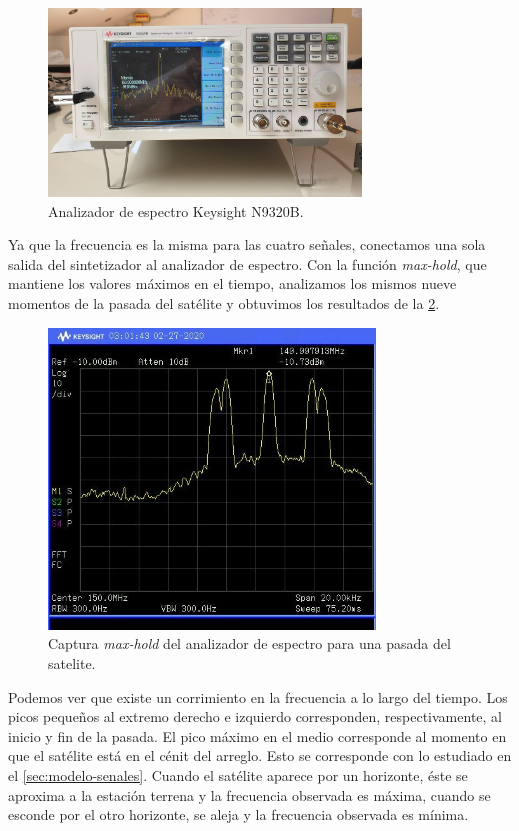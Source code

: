 \documentclass{article}
\newenvironment{standalone}{\begin{preview}}{\end{preview}}
\begin{document}
\begin{standalone}
  \begin{figure}[!htbp]
    \centering
    \includegraphics[width=\linewidth, height=50mm, keepaspectratio]{../images/analizador-espectro.jpg}
    \caption{Analizador de espectro Keysight N9320B.}
    \label{fig:analizador-espectro}
  \end{figure}

  Ya que la frecuencia es la misma para las cuatro señales, conectamos una sola salida del sintetizador al analizador de espectro.
  Con la función \textit{max-hold}, que mantiene los valores máximos en el tiempo, analizamos los mismos nueve momentos de la pasada del satélite y obtuvimos los resultados de la \cref{fig:pasada-analizador-espectro}.

  \begin{figure}[!htbp]
    \centering
    \includegraphics[width=\linewidth, height=80mm, keepaspectratio]{../images/pasada-analizador-espectro.jpg}
    \caption{Captura \textit{max-hold} del analizador de espectro para una pasada del satelite.}
    \label{fig:pasada-analizador-espectro}
  \end{figure}

  Podemos ver que existe un corrimiento en la frecuencia a lo largo del tiempo.
  Los picos pequeños al extremo derecho e izquierdo corresponden, respectivamente, al inicio y fin de la pasada.
  El pico máximo en el medio corresponde al momento en que el satélite está en el cénit del arreglo.
  Esto se corresponde con lo estudiado en el \cref{sec:modelo-senales}.
  Cuando el satélite aparece por un horizonte, éste se aproxima a la estación terrena y la frecuencia observada es máxima, cuando se esconde por el otro horizonte, se aleja y la frecuencia observada es mínima.


\end{standalone}
\end{document}
